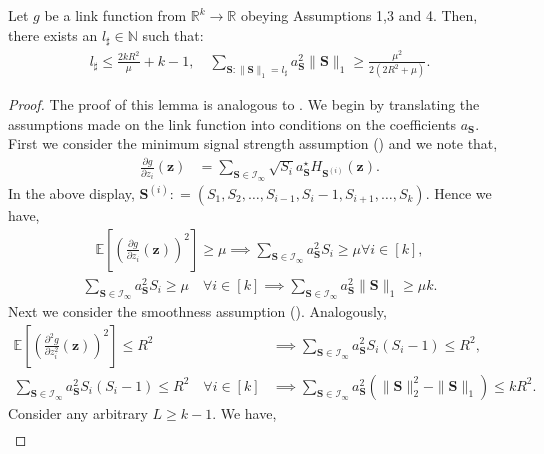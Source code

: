 \documentclass[final,12pt]{colt2018} %
\newcommand{\N}{\mathbb{N}}
\newcommand{\E}{\mathbb{E}}
\newcommand{\R}{\mathbb{R}}
\renewcommand\v[1]{{\ensuremath{\boldsymbol{#1}}}}
\begin{document}
\begin{lemma}Let $g$ be a link function from $\R^k \rightarrow \R$ obeying Assumptions 1,3 and 4. Then, there exists an $l_\sharp \in \N$ such that:
\begin{align*}
    l_\sharp \leq \frac{2kR^2}{\mu} + k - 1, \quad \sum_{{\v S}: \|{\v S}\|_1 = l_\sharp} a_{\v S}^2 \|{\v S}\|_1 \geq \frac{\mu^2}{2(2R^2 + \mu)}.
\end{align*}
\label{lemma: good_l_multiindex_restated}
\end{lemma}
\begin{proof} The proof of this lemma is analogous to . We begin by translating the assumptions made on the link function into conditions on the coefficients $a_{\v S}$. 
First we consider the minimum signal strength assumption () and we note that,
\begin{align*}
    \frac{\partial g}{\partial z_i}(\v z) & = \sum_{\v S \in \mathcal{I}_\infty} \sqrt{S_i} a_{\v S}^\star H_{\v S^{(i)}}(\v z).
\end{align*}
In the above display, $\v S^{(i)}: = (S_1, S_2, \dotsc, S_{i-1}, S_i-1, S_{i+1}, \dotsc, S_k)$. Hence we have,
\begin{align*}
    \E \left[ \left( \frac{\partial g}{\partial z_i}(\v z) \right)^2 \right] \geq \mu \implies \sum_{{\v S} \in \mathcal{I}_\infty} a_{\v S}^2 S_i \geq \mu \forall i \in [k], 
\end{align*}
\begin{align}
    \sum_{{\v S} \in \mathcal{I}_\infty} a_{\v S}^2 S_i \geq \mu \quad \forall i \in [k] \implies \sum_{{\v S} \in \mathcal{I}_\infty} a_{\v S}^2 \|{\v S}\|_1 \geq \mu k.
    \label{eq: good_l_multiindex_eq2}
\end{align}
Next we consider the smoothness assumption (). Analogously, 
\begin{align}
    \E \left[ \left( \frac{\partial^2 g}{\partial z_i^2}(\v z) \right)^2 \right] \leq R^2 &\implies \sum_{{\v S} \in \mathcal{I}_\infty} a_{\v S}^2 S_i(S_i-1)  \leq R^2, \nonumber \\
    \sum_{{\v S} \in \mathcal{I}_\infty} a_{\v S}^2 S_i(S_i-1)  \leq R^2 \quad \forall i \in [k] &\implies \sum_{{\v S} \in \mathcal{I}_\infty} a_{\v S}^2 ( \|{\v S}\|_2^2 - \|{\v S}\|_1) \leq kR^2. \label{eq: good_l_multiindex_eq3}
\end{align}
Consider any arbitrary $L \geq k-1$. We have,
\begin{align}

\end{align}
\end{proof}
\end{document}
